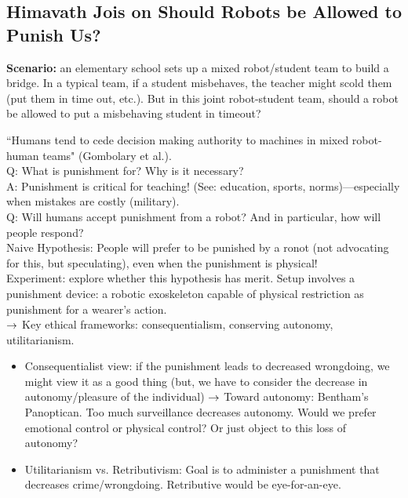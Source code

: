 \subsection{Himavath Jois on Should Robots be Allowed to Punish Us?}

{\bf Scenario:} an elementary school sets up a mixed robot/student team to build a bridge. In a typical team, if a student misbehaves, the teacher might scold them (put them in time out, etc.). But in this joint robot-student team, should a robot be allowed to put a misbehaving student in timeout? \\


``Humans tend to cede decision making authority to machines in mixed robot-human teams" (Gombolary et al.). \\

Q: What is punishment for? Why is it necessary? \\

A: Punishment is critical for teaching! (See: education, sports, norms)---especially when mistakes are costly (military). \\

Q: Will humans accept punishment from a robot? And in particular, how will people respond? \\

Naive Hypothesis: People will prefer to be punished by a ronot (not advocating for this, but speculating), even when the punishment is physical! \\

Experiment: explore whether this hypothesis has merit. Setup involves a punishment device: a robotic exoskeleton capable of physical restriction as punishment for a wearer's action. \\

$\rightarrow$ Key ethical frameworks: consequentialism, conserving autonomy, utilitarianism. \\

\begin{itemize}
	\item Consequentialist view: if the punishment leads to decreased wrongdoing, we might view it as a good thing (but, we have to consider the decrease in autonomy/pleasure of the individual)
	$\rightarrow$ Toward autonomy: Bentham's Panoptican. Too much surveillance decreases autonomy. Would we prefer emotional control or physical control? Or just object to this loss of autonomy?

	\item Utilitarianism vs. Retributivism: Goal is to administer a punishment that decreases crime/wrongdoing. Retributive would be eye-for-an-eye.

\end{itemize}

